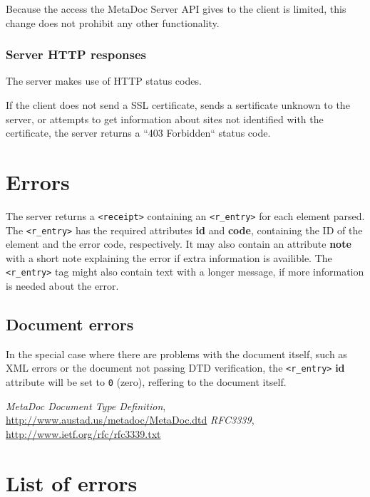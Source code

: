 \documentclass[titlepage, a4paper,10pt]{article}
\begin{document}
Because the access the MetaDoc Server API gives to the client is limited, this 
change does not prohibit any other functionality. 

\subsubsection{Server HTTP responses}

The server makes use of HTTP status codes.

If the client does not send a SSL certificate, sends a sertificate unknown to 
the server, or attempts to get information about sites not identified with the
certificate, the server returns a ``403 Forbidden`` status code.

\section{Errors}
\label{sec:errors}

The server returns a \texttt{<receipt>} containing an \texttt{<r\_entry>} for 
each element parsed. The \texttt{<r\_entry>} has the required attributes 
\textbf{id} and \textbf{code}, containing the ID of the element and the error 
code, respectively. It may also contain an attribute \textbf{note} with a short 
note explaining the error if extra information is availible. The 
\texttt{<r\_entry>} tag might also contain text with a longer message, if more 
information is needed about the error. 

\subsection{Document errors}

In the special case where there are problems with the document itself, such as 
XML errors or the document not passing DTD verification, the \texttt{<r\_entry>} 
\textbf{id} attribute will be set to \texttt{0} (zero), reffering to the 
document itself. 


\newpage
\begin{thebibliography}{99}
     \textit{MetaDoc Document Type Definition}, 
        \url{http://www.austad.us/metadoc/MetaDoc.dtd}
     \textit{RFC3339}, \url{http://www.ietf.org/rfc/rfc3339.txt}
\end{thebibliography}

\newpage
\appendix

\section{List of errors}
\end{document}
